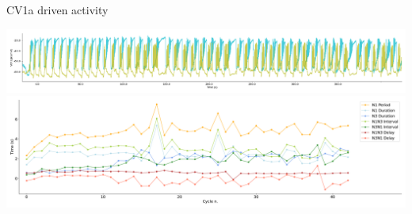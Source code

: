 \documentclass[aspectratio=43]{beamer}
\begin{document}
\begin{frame}{CV1a driven activity}
{		\begin{minipage}[c]{0.1\textwidth} %
			\centering
		\end{minipage}%
		\begin{minipage}[c]{0.85\textwidth}
			\centering
			\includegraphics[width=\textwidth]{invariants/data/SUSSEX/CV1a_driven2/images/_signal_intervals_zoom.png}\\
			\includegraphics[width=\textwidth]{invariants/data/SUSSEX/CV1a_driven2/images/_time_cycle.pdf}
		\end{minipage}
		
}
\end{frame}
\end{document}
